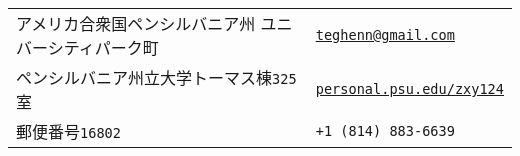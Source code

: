 \documentclass[utf8,letterpaper,oneside]{article}
\begin{document}
\setmainfont{kaiu.ttf}
\small
\begin{center}
 \begin{tabular}{l l}
  アメリカ合衆国ペンシルバニア州  ユニバーシティパーク町 & \hspace{1in} \href{mailto:teghenn@gmail.com}{\texttt{teghenn@gmail.com}}                \\
  ペンシルバニア州立大学トーマス棟\texttt{325}室         & \hspace{1in}   \href{http://personal.psu.edu/zxy124/}{\texttt{personal.psu.edu/zxy124}} \\
  郵便番号\texttt{16802}                                 & \hspace{1in}\texttt{+1 (814) 883-6639}                                                  \\
 \end{tabular}
\end{center}
\noindent
\end{document}
